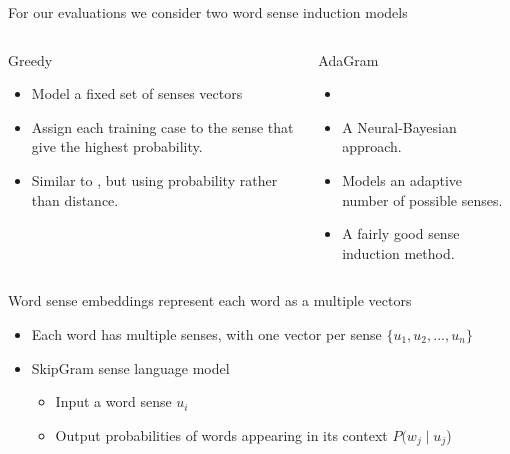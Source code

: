 \documentclass[dvipsnames]{beamer}
\begin{document}
\begin{frame}{For our evaluations we consider two word sense induction models}
	\begin{columns}[T]
		\begin{column}{0.5\textwidth}
			\alert{Greedy}
			\begin{itemize}
				\item Model a \alert{fixed set} of senses vectors
				\item Assign each training case to the sense that give the \alert{highest probability}.
				\item Similar to \textcite{neelakantan2015efficient}, but using \alert{probability} rather than distance.
			\end{itemize}
		\end{column}
		\begin{column}{0.5\textwidth}
			\alert{AdaGram}
			\begin{itemize}
				\item \textcite{AdaGrams}
				\item A Neural-Bayesian approach.
				\item Models an \alert{adaptive number} of possible senses.
				\item A fairly good sense induction method.
			\end{itemize}
		\end{column}	
	\end{columns}
\end{frame}

\begin{frame}{Word sense embeddings represent each word as a multiple vectors}
	\begin{itemize}
		\item Each word has multiple senses, with one vector per sense $\{u_1, u_2, ..., u_n\}$
		\item SkipGram sense language model  \begin{itemize}
			\item \alert{Input} a word sense $u_i$
			\item \alert{Output} probabilities of words appearing in its context \alert{$P(w_j \mid u_j$)}
		\end{itemize}
	\end{itemize}
	\sentexample
\end{frame}
\end{document}
